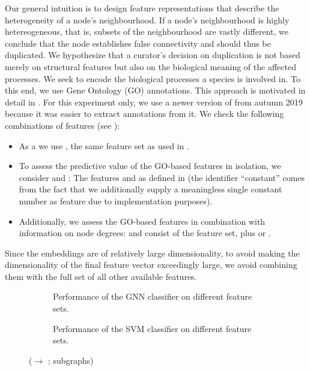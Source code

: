 \documentclass[
	fontsize=10pt, %
	twoside=true, %
	secnumdepth=1, %
  toc=indentunnumbered %
]{kaobook}
\begin{document}
Our general intuition is to design feature representations that describe the
heterogeneity of a node's neighbourhood. If a node's neighbourhood is highly
hetereogeneous, that is, subsets of the neighbourhood are vastly different, we
conclude that the node establishes false connectivity and should thus be
duplicated. We hypothesize that a curator's decision on duplication is not based
merely on structural features but also on the biological meaning of the affected
processes. We seek to encode the biological processes a species is involved in.
To this end, we use Gene Ontology (GO) annotations. This approach is motivated in detail
in . For this experiment only, we use a newer version of
\PDMap{} from autumn 2019 because it was easier to extract annotations from it.
%
We check the following combinations of features (see ):
\begin{itemize}
\item As a  we use , the same feature set as used in
  .
\item To assess the predictive value of the GO-based features in isolation, we consider
   and : The features
   and  as defined in
   (the identifier ``constant'' comes from the fact
  that we additionally supply a meaningless single constant number as feature
  due to implementation purposes).
\item Additionally, we assess the GO-based features in combination with
  information on node degrees:  and  consist
  of the  feature set, plus  or .
\end{itemize}
Since the embeddings are of relatively large dimensionality, to avoid making the
dimensionality of the final feature vector exceedingly large, we avoid combining them with
the full set of all other available features.


\begin{figure}[h]
  \centering
  \begin{subfigure}{0.48\linewidth}
    \caption{Performance of the GNN classifier on different feature sets.}
  \end{subfigure}
  \begin{subfigure}{0.48\linewidth}
    \caption{Performance of the SVM classifier on different feature sets.}
  \end{subfigure}
  \caption{(\ADLast $\rightarrow$ \PDMap{}; subgraphs)}
  \label{fig:annotations-results}
\end{figure}
\end{document}
